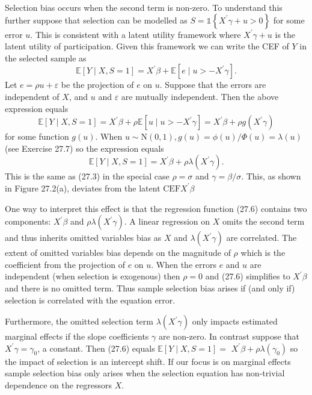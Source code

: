 \documentclass[10pt]{article}
\begin{document}
Selection bias occurs when the second term is non-zero. To understand this further suppose that selection can be modelled as $S=\mathbb{1}\left\{X^{\prime} \gamma+u>0\right\}$ for some error $u$. This is consistent with a latent utility framework where $X^{\prime} \gamma+u$ is the latent utility of participation. Given this framework we can write the CEF of $Y$ in the selected sample as
$$
\mathbb{E}[Y \mid X, S=1]=X^{\prime} \beta+\mathbb{E}\left[e \mid u>-X^{\prime} \gamma\right] .
$$
Let $e=\rho u+\varepsilon$ be the projection of $e$ on $u$. Suppose that the errors are independent of $X$, and $u$ and $\varepsilon$ are mutually independent. Then the above expression equals
$$
\mathbb{E}[Y \mid X, S=1]=X^{\prime} \beta+\rho \mathbb{E}\left[u \mid u>-X^{\prime} \gamma\right]=X^{\prime} \beta+\rho g\left(X^{\prime} \gamma\right)
$$
for some function $g(u)$. When $u \sim \mathrm{N}(0,1), g(u)=\phi(u) / \Phi(u)=\lambda(u)$ (see Exercise 27.7) so the expression equals
$$
\mathbb{E}[Y \mid X, S=1]=X^{\prime} \beta+\rho \lambda\left(X^{\prime} \gamma\right) .
$$
This is the same as (27.3) in the special case $\rho=\sigma$ and $\gamma=\beta / \sigma$. This, as shown in Figure 27.2(a), deviates from the latent $\mathrm{CEF} X^{\prime} \beta$

One way to interpret this effect is that the regression function (27.6) contains two components: $X^{\prime} \beta$ and $\rho \lambda\left(X^{\prime} \gamma\right)$. A linear regression on $X$ omits the second term and thus inherits omitted variables bias as $X$ and $\lambda\left(X^{\prime} \gamma\right)$ are correlated. The extent of omitted variables bias depends on the magnitude of $\rho$ which is the coefficient from the projection of $e$ on $u$. When the errors $e$ and $u$ are independent (when selection is exogenous) then $\rho=0$ and (27.6) simplifies to $X^{\prime} \beta$ and there is no omitted term. Thus sample selection bias arises if (and only if) selection is correlated with the equation error.

Furthermore, the omitted selection term $\lambda\left(X^{\prime} \gamma\right)$ only impacts estimated marginal effects if the slope coefficients $\gamma$ are non-zero. In contrast suppose that $X^{\prime} \gamma=\gamma_{0}$, a constant. Then (27.6) equals $\mathbb{E}[Y \mid X, S=1]=$ $X^{\prime} \beta+\rho \lambda\left(\gamma_{0}\right)$ so the impact of selection is an intercept shift. If our focus is on marginal effects sample selection bias only arises when the selection equation has non-trivial dependence on the regressors $X$.
\end{document}
